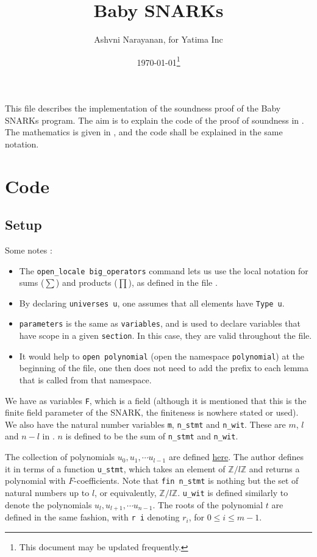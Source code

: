 \documentclass{article}
\title{Baby SNARKs}
\author{Ashvni Narayanan, for Yatima Inc}
\date{\today\footnote{This document may be updated frequently.}}
\theoremstyle{definition}
\theoremstyle{remark}
\begin{document}
\maketitle

This file describes the implementation of the soundness proof of the Baby SNARKs program. The aim is to explain the code of the proof of soundness in \cite{code}. The mathematics is given in \cite{main}, and the code shall be explained in the same notation.

\section{Code}
\subsection{Setup}
Some notes :
\begin{itemize}
  \item The \texttt{open\_locale big\_operators} command lets us use the local notation for sums ($\sum$) and products ($\prod$), as defined in the file \cite{big_operators}.
  \item By declaring \texttt{universes u}, one assumes that all elements have \texttt{Type u}.
  \item \texttt{parameters} is the same as \texttt{variables}, and is used to declare variables that have scope in a given \texttt{section}. In this case, they are valid throughout the file.
  \item It would help to \texttt{open polynomial} (open the namespace \texttt{polynomial}) at the beginning of the file, one then does not need to add the prefix to each lemma that is called from that namespace.
\end{itemize}

We have as variables \texttt{F}, which is a field (although it is mentioned that this is the finite field parameter of the SNARK, the finiteness is nowhere stated or used). We also 
have the natural number variables \texttt{m}, \texttt{n\_stmt} and \texttt{n\_wit}. These are $m$, $l$ and $n - l$ in \cite{main}. $n$ is defined to be the sum of \texttt{n\_stmt} and \texttt{n\_wit}. 

The collection of polynomials $u_0, u_1, \cdots u_{l - 1}$ are defined \href{https://github.com/BoltonBailey/formal-snarks-project/blob/7fd9cd122f5887f88f6a706b4f2a68a7153c7381/src/snarks/babysnark/knowledge_soundness.lean#L59}{here}. 
The author defines it in terms of a function \texttt{u\_stmt}, which takes an element of $\mathbb{Z}/l \mathbb{Z}$ and returns a polynomial with $F$-coefficients. Note that \texttt{fin n\_stmt} is nothing but the set of natural numbers 
up to $l$, or equivalently, $\mathbb{Z}/l \mathbb{Z}$. \texttt{u\_wit} is defined similarly to denote the polynomials $u_l, u_{l + 1}, \cdots u_{n - 1}$. The roots of the polynomial $t$ are defined in the same fashion, with 
\texttt{r i} denoting $r_i$, for $0 \le i \le m - 1$. 
\end{document}
